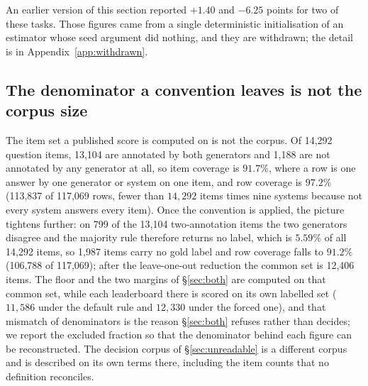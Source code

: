 \documentclass{article}
\begin{document}
An earlier version of this section reported $+1.40$ and $-6.25$ points for two of these tasks. Those figures came from a single deterministic initialisation of an estimator whose seed argument did nothing, and they are withdrawn; the detail is in Appendix~\ref{app:withdrawn}.
\begin{table}[htbp] \centering \small

\caption{Latent-variable agreement against majority-vote agreement, as percentages of the reproduction rate of the weakest annotator in the floor pool, the first of the two columns read against the pool's own majority gold and the second against the fitted latent truth, with the conditions under which each value was produced; the bracketed figure is their difference in points. Neither column is a floor in the sense of \eqref{eq:loo}: that quantity is a maximum over gold generators, while these two are minima over annotators (\S\ref{sec:refuse}), and \S\ref{sec:ds} accepts none of the four values as an estimate of a floor. The pool and its common item set are not the reference set of \S\ref{sec:human}, so these minima are not comparable with the distributions reported there. $K_{\mathrm{used}}$ is the label space actually fitted;
\emph{dropped} names a label removed before the fit because no starting point admitted it;
\emph{rej}/$n_{\mathrm{init}}$ counts starting points rejected by the identifiability screens;
\emph{minority} lists labels that win no item majority;
\emph{anchor} is the agreement between the fitted latent truth and majority vote, which is what resolves the label-permutation ambiguity. The sign of the difference is not constant across tasks.}
\label{tab:ds}
\end{table}
\subsection{The denominator a convention leaves is not the corpus size}
\label{sec:coverage} The item set a published score is computed on is not the corpus. Of 14,292 question items, 13,104 are annotated by both generators and 1,188 are not annotated by any generator at all, so item coverage is $91.7\%$, where a row is one answer by one generator or system on one item, and row coverage is $97.2\%$ (113,837 of 117,069 rows, fewer than $14,292$ items times nine systems because not every system answers every item). Once the convention is applied, the picture tightens further: on 799 of the 13,104 two-annotation items the two generators disagree and the majority rule therefore returns no label, which is $5.59\%$ of all 14,292 items, so 1,987 items carry no gold label and row coverage falls to $91.2\%$ (106,788 of 117,069); after the leave-one-out reduction the common set is 12,406 items. The floor and the two margins of \S\ref{sec:both} are computed on that common set, while each leaderboard there is scored on its own labelled set ($11{,}586$ under the default rule and $12{,}330$ under the forced one), and that mismatch of denominators is the reason \S\ref{sec:both} refuses rather than decides; we report the excluded fraction so that the denominator behind each figure can be reconstructed. The decision corpus of \S\ref{sec:unreadable} is a different corpus and is described on its own terms there, including the item counts that no definition reconciles.
\end{document}
